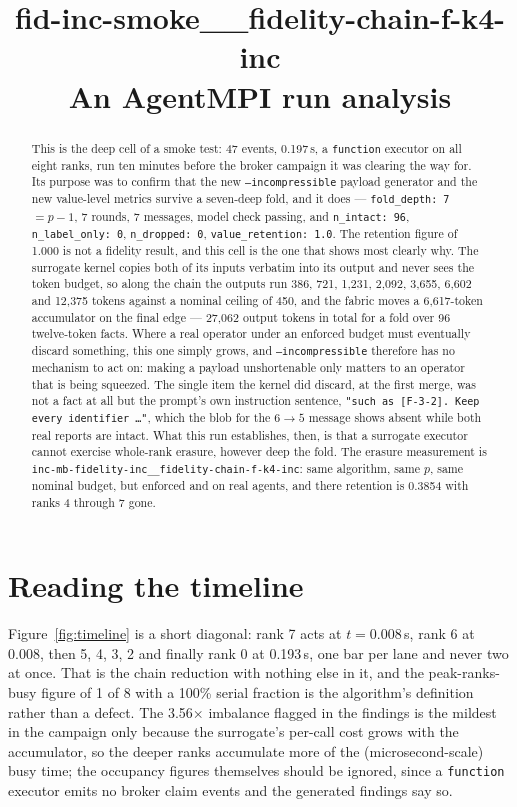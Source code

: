 \documentclass[11pt]{article}
\title{\textbf{fid-inc-smoke\_\_fidelity-chain-f-k4-inc}\\[2pt]\large An AgentMPI run analysis}
\author{}
\date{}
\begin{document}
\maketitle

\begin{abstract}
This is the deep cell of a smoke test: 47 events, 0.197\,s, a \texttt{function} executor on
all eight ranks, run ten minutes before the broker campaign it was clearing the way for. Its
purpose was to confirm that the new \texttt{--incompressible} payload generator and the new
value-level metrics survive a seven-deep fold, and it does --- \texttt{fold\_depth: 7} $=
p-1$, 7 rounds, 7 messages, model check passing, and \texttt{n\_intact: 96},
\texttt{n\_label\_only: 0}, \texttt{n\_dropped: 0}, \texttt{value\_retention: 1.0}. The
retention figure of 1.000 is not a fidelity result, and this cell is the one that shows most
clearly why. The surrogate kernel copies both of its inputs verbatim into its output and
never sees the token budget, so along the chain the outputs run 386, 721, 1{,}231, 2{,}092,
3{,}655, 6{,}602 and 12{,}375 tokens against a nominal ceiling of 450, and the fabric moves
a 6{,}617-token accumulator on the final edge --- 27{,}062 output tokens in total for a fold
over 96 twelve-token facts. Where a real operator under an enforced budget must eventually
discard something, this one simply grows, and \texttt{--incompressible} therefore has no
mechanism to act on: making a payload unshortenable only matters to an operator that is
being squeezed. The single item the kernel did discard, at the first merge, was not a fact
at all but the prompt's own instruction sentence, \texttt{"such as [F-3-2]. Keep every
identifier \dots"}, which the blob for the $6\to5$ message shows absent while both real
reports are intact. What this run establishes, then, is that a surrogate executor cannot
exercise whole-rank erasure, however deep the fold. The erasure measurement is
\texttt{inc-mb-fidelity-inc\_\_fidelity-chain-f-k4-inc}: same algorithm, same $p$, same
nominal budget, but enforced and on real agents, and there retention is 0.3854 with ranks 4
through 7 gone.
\end{abstract}



\section{Reading the timeline}

Figure~\ref{fig:timeline} is a short diagonal: rank 7 acts at $t=0.008$\,s, rank 6 at 0.008,
then 5, 4, 3, 2 and finally rank 0 at 0.193\,s, one bar per lane and never two at once. That
is the chain reduction with nothing else in it, and the peak-ranks-busy figure of 1 of 8 with
a 100\% serial fraction is the algorithm's definition rather than a defect. The
3.56$\times$ imbalance flagged in the findings is the mildest in the campaign only because
the surrogate's per-call cost grows with the accumulator, so the deeper ranks accumulate more
of the (microsecond-scale) busy time; the occupancy figures themselves should be ignored,
since a \texttt{function} executor emits no broker claim events and the generated findings
say so.
\end{document}
